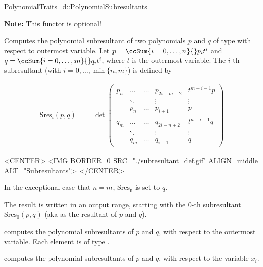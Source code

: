 \begin{ccRefConcept}{PolynomialTraits_d::PolynomialSubresultants}

\textbf{Note:} This functor is optional!

\ccDefinition

Computes the polynomial subresultant of two polynomials $p$ and $q$ of 
type  with respect to outermost variable.
Let 
$p=\ccSum{i=0,\ldots,n}{} p_i t^i$ and 
$q=\ccSum{i=0,\ldots,m}{} q_i t^i$, where $t$
is the outermost variable.
The $i$-th subresultant (with $i=0,\ldots,\min\{n,m\}$) is defined by

\begin{ccTexOnly}
\begin{eqnarray*}
\mathrm{Sres}_i(p,q)&=&\det \left(\begin{array}{cccccc}
p_n & \ldots &\ldots& p_{2i-m+2}&t^{m-i-1}p \\
&\ddots&&\vdots&\vdots\\
&p_n&\ldots&p_{i+1}&p\\
q_m & \ldots &\ldots & q_{2i-n+2}&t^{n-i-1}q \\
&\ddots&&\vdots&\vdots\\
&q_m&\ldots&q_{i+1}&q
\end{array}\right)
\end{eqnarray*}
\end{ccTexOnly}

\begin{ccHtmlOnly}
<CENTER>
<IMG BORDER=0 SRC="./subresultant_def.gif" ALIGN=middle ALT="Subresultants">
</CENTER>
\end{ccHtmlOnly}

In the exceptional case that $n=m$, $\mathrm{Sres_n}$ is set to $q$.

The result is written in an output range, starting with the $0$-th subresultant
$\mathrm{Sres}_0(p,q)$
(aka as the resultant of $p$ and $q$).


\ccOperations
{}
         { computes the polynomial subresultants of $p$ and $q$, 
           with respect to the outermost variable. Each element is of type
           .}

         { computes the polynomial subresultants of $p$ and $q$, 
           with respect to the variable $x_i$.}


\ccSeeAlso

\\
\\

\end{ccRefConcept}
